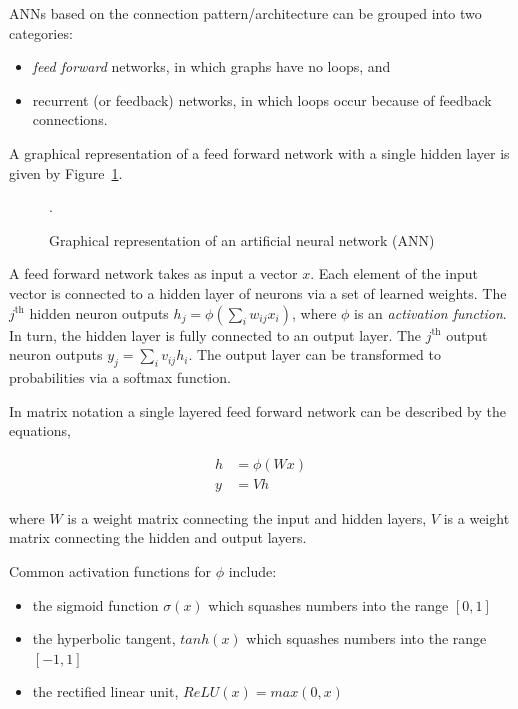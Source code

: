 ANNs based on the connection pattern/architecture can be grouped into two
categories:

\begin{itemize}
    \item \textit{feed forward} networks, in which graphs have no loops, and
    \item recurrent (or feedback) networks, in which loops occur
    because of feedback connections.
\end{itemize}

A graphical representation of a feed forward network with a single hidden layer
is given by Figure~\ref{fig:ann}.

\begin{figure}[!htbp]
    \centering
    
    \caption{Graphical representation of an artificial neural network (ANN)}.\label{fig:ann}
\end{figure}

A feed forward network takes as input a vector \(x\). Each element of the input
vector is connected to a hidden layer of neurons via a set of learned weights.
The \(j^{\text{th}}\) hidden neuron outputs \(h_j = \phi (\sum_{i} w_{ij}
x_{i})\), where \(\phi\) is an \textit{activation function}. In turn, the hidden
layer is fully connected to an output layer. The \(j^{\text{th}}\) output neuron
outputs \(y_{j} = \sum_{i} v_{ij} h_{i}\). The output layer can be transformed
to probabilities via a softmax function. 

In matrix notation a single layered feed forward network can be described by
the equations,

\begin{align}\label{eq:neural_network_equations}
h & = \phi(Wx) \\ \label{eq:neural_network_equations_two}
y & = Vh
\end{align}

where \(W\) is a weight matrix connecting the input and hidden layers, \(V\) is
a weight matrix connecting the hidden and output layers.

Common activation functions for \(\phi\) include:

\begin{itemize}
    \item the sigmoid function \(\sigma(x)\) which squashes numbers into the range \([0, 1]\)
    \item the hyperbolic tangent, \(tanh(x)\) which squashes numbers into the range \([-1, 1]\)
    \item the rectified linear unit, \(ReLU(x)=max(0,x)\)
\end{itemize}

